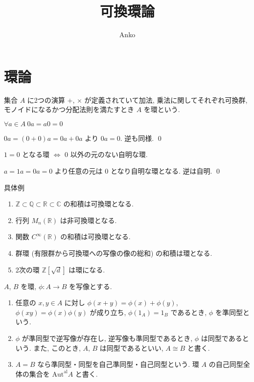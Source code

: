 \documentclass[uplatex,dvipdfmx,a4paper,11pt]{jlreq}
\title{可換環論}
\author{Anko}
\makeatletter
\theoremstyle{definition}
\renewenvironment{proof}[1][\proofname]{\par
  \normalfont
  \topsep6\p@\@plus6\p@ \trivlist
  \item[\hskip\labelsep{\bfseries #1}\@addpunct{\bfseries}]\ignorespaces\quad\par
}{%
  \qed\endtrivlist\@endpefalse
}
\renewcommand\proofname{証明}
\makeatother
\begin{document}
\maketitle
\tableofcontents
\clearpage

\section{環論}
\begin{definition}[環]
  集合 $A$ に2つの演算 $+$, $\times$ が定義されていて加法, 乗法に関してそれぞれ可換群, モノイドになるかつ分配法則を満たすとき $A$ を環という.
\end{definition}

\begin{proposition}
  $\forall a\in A\ 0a = a0 = 0$
\end{proposition}
\begin{proof}
  $0a = (0 + 0)a = 0a + 0a$ より $0a = 0$. 逆も同様.
\end{proof}

\begin{proposition}
  $1=0$ となる環 $\iff$ $0$ 以外の元のない自明な環.
\end{proposition}
\begin{proof}
  $a = 1a = 0a = 0$ より任意の元は $0$ となり自明な環となる. 逆は自明.
\end{proof}

具体例
\begin{enumerate}
  \item $\mathbb{Z}\subset\mathbb{Q}\subset\mathbb{R}\subset\mathbb{C}$ の和積は可換環となる.
  \item 行列 $M_n(\mathbb{R})$ は非可換環となる.
  \item 関数 $C^\infty(\mathbb{R})$ の和積は可換環となる.
  \item 群環 (有限群から可換環への写像の像の総和) の和積は環となる.
  \item 2次の環 $\mathbb{Z}[\sqrt{d}]$ は環になる.
\end{enumerate}

\begin{definition}[準同型・同型]
  $A$, $B$ を環, $\phi:A\to B$ を写像とする.
  \begin{enumerate}
    \item 任意の $x,y\in A$ に対し $\phi(x+y) = \phi(x) + \phi(y)$, $\phi(xy) = \phi(x)\phi(y)$ が成り立ち, $\phi(1_A) = 1_B$ であるとき, $\phi$ を準同型という.
    \item $\phi$ が準同型で逆写像が存在し, 逆写像も準同型であるとき, $\phi$ は同型であるという. また, このとき, $A$, $B$ は同型であるといい, $A\cong B$ と書く.
    \item $A = B$ なら準同型・同型を自己準同型・自己同型という. 環 $A$ の自己同型全体の集合を $\mathrm{Aut}^{\mathrm{al}}A$ と書く.
  \end{enumerate}
\end{definition}
\end{document}
